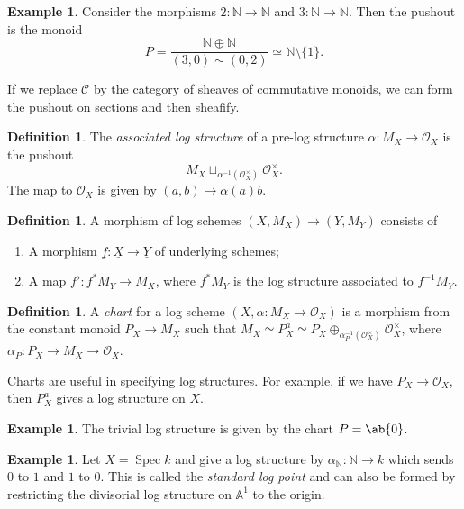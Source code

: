 \documentclass{amsart}
\theoremstyle{definition}
\newtheorem{defn}[thm]{Definition}
\newtheorem{exm}[thm]{Example}
\theoremstyle{remark}
\theoremstyle{plain}
\theoremstyle{definition}
\theoremstyle{remark}
\newcommand{\A}{\mathbb{A}}
\newcommand{\N}{\mathbb{N}}
\newcommand{\mc}[1]{\mathcal{#1}}
\newcommand{\ul}[1]{\underline{#1}}
\newcommand{\1}{\mathbf{1}}
\newcommand{\2}{\mathbf{2}}
\newcommand{\3}{\mathbf{3}}
\DeclareMathOperator{\Spec}{Spec}
\begin{document}
\begin{exm}
    Consider the morphisms \(2 \colon \N \to \N\) and \(3 \colon \N \to \N\). Then the pushout is the monoid
    \[ P = \frac{\N \oplus \N}{(3, 0) \sim (0,2)} \simeq \N \setminus \{1\}. \]
\end{exm}

If we replace \(\mc{C}\) by the category of sheaves of commutative monoids, we can form the pushout on sections and then sheafify.

\begin{defn}
    The \textit{associated log structure} of a pre-log structure \(\alpha \colon M_X \to \mc{O}_X\) is the pushout 
    \[ M_X \sqcup_{\alpha^{-1}(\mc{O}_X^{\times})} \mc{O}_X^{\times}. \]
    The map to \(\mc{O}_X\) is given by \((a,b) \to \alpha(a) b\). 
\end{defn}

\begin{defn}
    A morphism of log schemes \((X, M_X) \to (Y, M_Y)\) consists of
    \begin{enumerate}
        \item A morphism \(\ul{f} \colon \ul{X} \to \ul{Y}\) of underlying schemes;
        \item A map \(f^{\flat} \colon f^* M_Y \to M_X\), where \(f^* M_Y\) is the log structure associated to \(f^{-1} M_Y\).  
    \end{enumerate}
\end{defn}

\begin{defn}
    A \textit{chart} for a log scheme \((X, \alpha \colon M_X \to \mc{O}_X)\) is a morphism from the constant monoid \(P_X \to M_X\) such that \(M_X \simeq P_X^a \simeq P_X \oplus_{\alpha_P^{-1}(\mc{O}_X^{\times})} \mc{O}_X^{\times}\), where \(\alpha_P \colon P_X \to M_X \to \mc{O}_X\).
\end{defn}

Charts are useful in specifying log structures. For example, if we have \(P_X \to \mc{O}_X\), then \(P_X^a\) gives a log structure on \(X\).

\begin{exm}
    The trivial log structure is given by the chart \(P = \ab\{0\}\).
\end{exm}

\begin{exm}
    Let \(X = \Spec k\) and give a log structure by \(\alpha_{\N} \colon \N \to k\) which sends \(0\) to \(1\) and \(1\) to \(0\). This is called the \textit{standard log point} and can also be formed by restricting the divisorial log structure on \(\A^1\) to the origin.
\end{exm}
\end{document}
